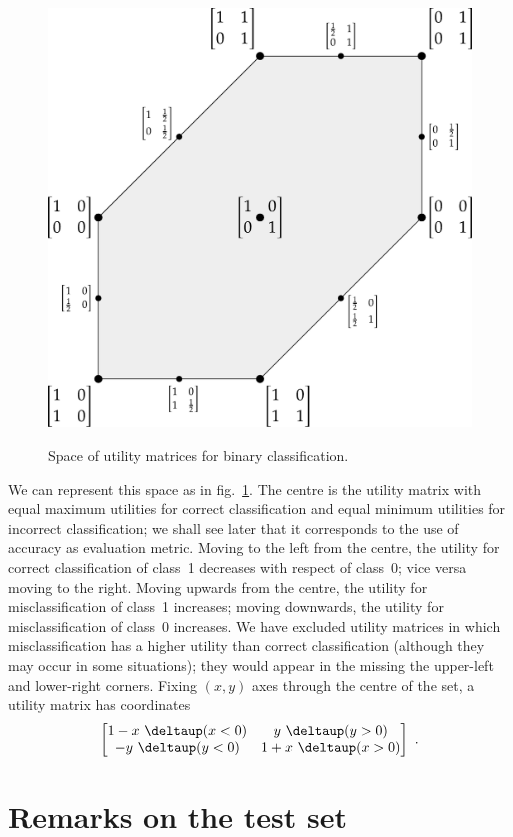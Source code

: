 \documentclass[\ifafour a4paper,12pt,\else a5paper,10pt,\fi%
onecolumn,oneside,article,%
british%
]{memoir}
\theoremstyle{remark}
\theoremstyle{innote}
\newcommand*{\delt}{\deltaup}%
\renewcommand*{\|}[1][]{\nonscript\:#1\vert\nonscript\:\mathopen{}}
\newcommand*{\fig}{fig.}%
\begin{document}
\begin{figure}[t]
  \centering
  \includegraphics[width=0.65\linewidth]{space_UM2c.pdf}\\
  \caption{Space of utility matrices for binary classification.}
  \label{fig:space_UM}
\end{figure}
We can represent this space as in \fig~\ref{fig:space_UM}. The centre is the utility matrix with equal maximum utilities for correct classification and equal minimum utilities for incorrect classification; we shall see later that it corresponds to the use of accuracy as evaluation metric. Moving to the left from the centre, the utility for correct classification of class~1 decreases with respect of class~0; vice versa moving to the right. Moving upwards from the centre, the utility for misclassification of class~1 increases; moving downwards, the utility for misclassification of class~0 increases. We have excluded utility matrices in which misclassification has a higher utility than correct classification (although they may occur in some situations); they would appear in the missing the upper-left and lower-right corners. Fixing $(x,y)$ axes through the centre of the set, a utility matrix has coordinates
\begin{equation}
  \label{eq:coords_um}
  \begin{bmatrix}
    1 - x\ \delt(x < 0) & y\ \delt(y>0) \\
    -y\ \delt(y<0) & 1 + x\ \delt(x > 0)
  \end{bmatrix} \ .
\end{equation}




\section{Remarks on the test set}
\label{sec:test_set}
\end{document}
